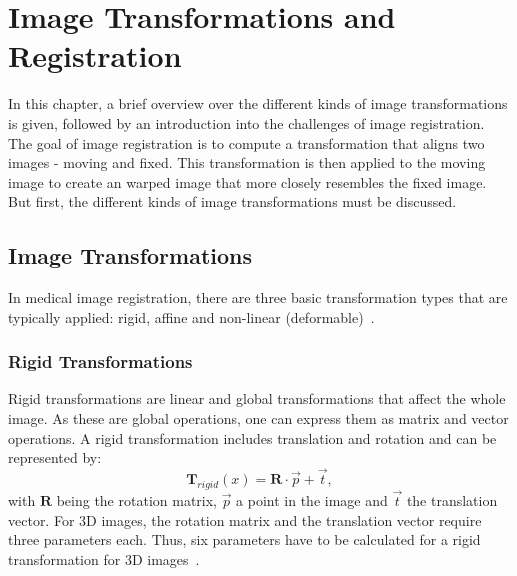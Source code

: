 \section{Image Transformations and Registration} \label{Sec:ImageTransformationsAndRegistration}
In this chapter, a brief overview over the different kinds of image transformations is given, followed by an introduction into the challenges of image registration.\\
The goal of image registration is to compute a transformation that aligns two images - moving and fixed. This transformation is then applied to the moving image to create an warped image that more closely resembles the fixed image. But first, the different kinds of image transformations must be discussed.

\subsection{Image Transformations} \label{SubSec:ImageTransformations}
In medical image registration, there are three basic transformation types that are typically applied: rigid, affine and non-linear (deformable)~\cite{Strittmatter2023}.

\subsubsection{Rigid Transformations}
Rigid transformations are linear and global transformations that affect the whole image. As these are global operations, one can express them as matrix and vector operations. A rigid transformation includes translation and rotation and can be represented by:
\begin{equation}
	\mathbf{T}_{rigid} (x) = \mathbf{R} \cdot \overrightarrow{p} + \overrightarrow{t},
\end{equation}
with $\mathbf{R}$ being the rotation matrix, $\overrightarrow{p}$ a point in the image and $\overrightarrow{t}$ the translation vector.  For 3D images, the rotation matrix and the translation vector require three parameters each. Thus, six parameters have to be calculated for a rigid transformation for 3D images~\cite{Strittmatter2023}.

